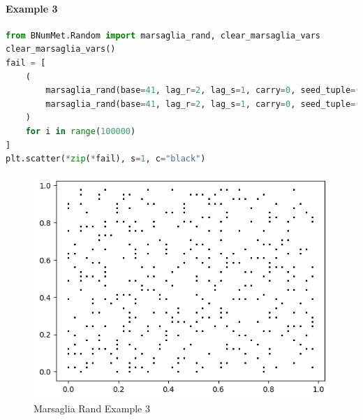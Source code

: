 \paragraph{Example 3}{
\begin{lstlisting}[language=Python]
from BNumMet.Random import marsaglia_rand, clear_marsaglia_vars
clear_marsaglia_vars()
fail = [
    (
        marsaglia_rand(base=41, lag_r=2, lag_s=1, carry=0, seed_tuple=(0, 1)),
        marsaglia_rand(base=41, lag_r=2, lag_s=1, carry=0, seed_tuple=(0, 1)),
    )
    for i in range(100000)
]
plt.scatter(*zip(*fail), s=1, c="black")
\end{lstlisting}
\begin{figure}[H]
    \centering
    \includegraphics{Include/Images/Thesis/Documentation/Randomness/Marsaglia Rand Example 3.png}
    \caption{Marsaglia Rand Example 3}
    \label{fig:Marsaglia Rand Example 3}
\end{figure}
}

